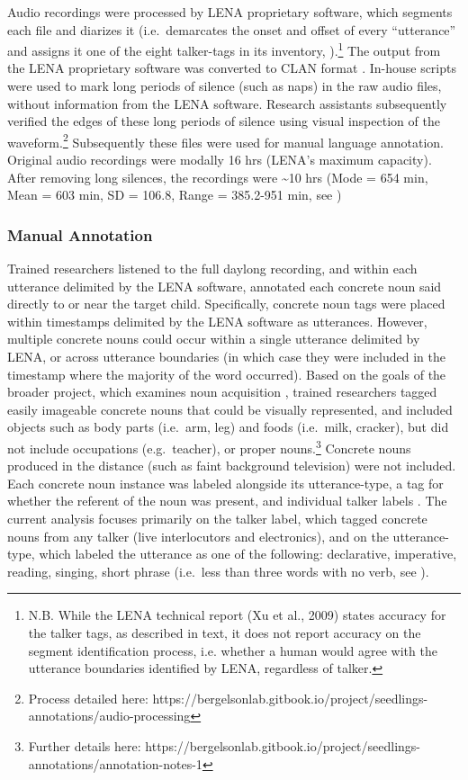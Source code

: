 \documentclass[man,floatsintext]{apa6}
\let\rmarkdownfootnote\footnote%
\def\footnote{\protect\rmarkdownfootnote}
\theoremstyle{definition}
\theoremstyle{definition}
\theoremstyle{definition}
\theoremstyle{remark}
\begin{document}
Audio recordings were processed by LENA proprietary software, which
segments each file and diarizes it (i.e.~demarcates the onset and offset
of every \enquote{utterance} and assigns it one of the eight talker-tags
in its inventory,
\citep{Xu2008}).\footnote{N.B. While the LENA technical report (Xu et al., 2009) states accuracy for the talker tags, as described in text, it does not report accuracy on the segment identification process, i.e. whether a human would agree with the utterance boundaries identified by LENA, regardless of talker.}
The output from the LENA proprietary software was converted to CLAN
format \citep{MacWhinney2010}. In-house scripts were used to mark long
periods of silence (such as naps) in the raw audio files, without
information from the LENA software. Research assistants subsequently
verified the edges of these long periods of silence using visual
inspection of the
waveform.\footnote{Process detailed here: https://bergelsonlab.gitbook.io/project/seedlings-annotations/audio-processing}
Subsequently these files were used for manual language annotation.
Original audio recordings were modally 16 hrs (LENA's maximum capacity).
After removing long silences, the recordings were \textasciitilde10 hrs
(Mode = 654 min, Mean = 603 min, SD = 106.8, Range = 385.2-951 min, see
\citet{Bergelson2018})

\hypertarget{manual-annotation}{%
\subsubsection{Manual Annotation}\label{manual-annotation}}

Trained researchers listened to the full daylong recording, and within
each utterance delimited by the LENA software, annotated each concrete
noun said directly to or near the target child. Specifically, concrete
noun tags were placed within timestamps delimited by the LENA software
as utterances. However, multiple concrete nouns could occur within a
single utterance delimited by LENA, or across utterance boundaries (in
which case they were included in the timestamp where the majority of the
word occurred). Based on the goals of the broader project, which
examines noun acquisition \citep{Bergelson2017}, trained researchers
tagged easily imageable concrete nouns that could be visually
represented, and included objects such as body parts (i.e.~arm, leg) and
foods (i.e.~milk, cracker), but did not include occupations
(e.g.~teacher), or proper
nouns.\footnote{Further details here: https://bergelsonlab.gitbook.io/project/seedlings-annotations/annotation-notes-1}
Concrete nouns produced in the distance (such as faint background
television) were not included. Each concrete noun instance was labeled
alongside its utterance-type, a tag for whether the referent of the noun
was present, and individual talker labels \citep[see][]{Bergelson2018}.
The current analysis focuses primarily on the talker label, which tagged
concrete nouns from any talker (live interlocutors and electronics), and
on the utterance-type, which labeled the utterance as one of the
following: declarative, imperative, reading, singing, short phrase
(i.e.~less than three words with no verb, see \citet{Bergelson2018}).
\end{document}
